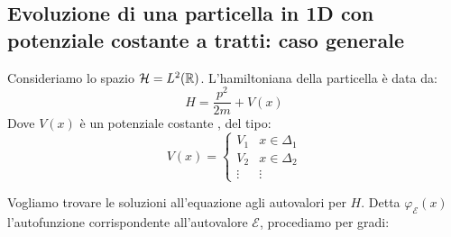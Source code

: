 \documentclass[../../FisicaTeorica.tex]{subfiles}
\begin{document}
\subsection{Evoluzione di una particella in 1D con potenziale costante a tratti: caso generale}
Consideriamo lo spazio $\mathcal{H}=L^2(\mathbb{R})$. L'hamiltoniana della particella è data da:
\[
H=\frac{p^2}{2m}+V(x)
\]
Dove $V(x)$ è un potenziale costante , del tipo:
\[
V(x)=\begin{cases}
V_1 & x \in \Delta_1\\
V_2 & x \in \Delta_2\\
\vdots & \vdots
\end{cases}
\]

Vogliamo trovare le soluzioni all'equazione agli autovalori per $H$. Detta  $\varphi_{\mathcal{E}}(x)$ l'autofunzione corrispondente all'autovalore $\mathcal{E}$, procediamo per gradi:
\end{document}
